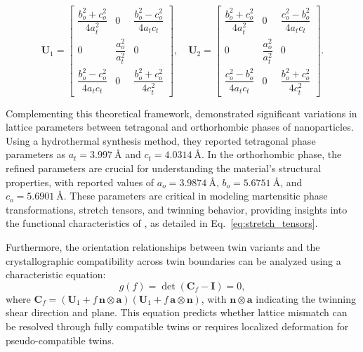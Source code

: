 \documentclass[a4paper,fleqn]{cas-sc}
\begin{document}
\begin{equation}
\mathbf{U}_1 = 
\begin{bmatrix}
\dfrac{b_o^2 + c_o^2}{4 a_t^2} & 0 & \dfrac{b_o^2 - c_o^2}{4 a_t c_t} \\
0 & \dfrac{a_o^2}{a_t^2} & 0 \\
\dfrac{b_o^2 - c_o^2}{4 a_t c_t} & 0 & \dfrac{b_o^2 + c_o^2}{4 c_t^2}
\end{bmatrix},
\quad
\mathbf{U}_2 = 
\begin{bmatrix}
\dfrac{b_o^2 + c_o^2}{4 a_t^2} & 0 & \dfrac{c_o^2 - b_o^2}{4 a_t c_t} \\
0 & \dfrac{a_o^2}{a_t^2} & 0 \\
\dfrac{c_o^2 - b_o^2}{4 a_t c_t} & 0 & \dfrac{b_o^2 + c_o^2}{4 c_t^2}
\end{bmatrix}.
\label{eq:stretch_tensors}
\end{equation}
\par Complementing this theoretical framework, \cite{zhu2024twinning} demonstrated significant variations in lattice parameters between tetragonal and orthorhombic phases of  nanoparticles. Using a hydrothermal synthesis method, they reported tetragonal phase parameters as \(a_t = \SI{3.997}{\angstrom}\) and \(c_t = \SI{4.0314}{\angstrom}\). In the orthorhombic phase, the refined parameters are crucial for understanding the material's structural properties, with reported values of \(a_o = \SI{3.9874}{\angstrom}\), \(b_o = \SI{5.6751}{\angstrom}\), and \(c_o = \SI{5.6901}{\angstrom}\). These parameters are critical in modeling martensitic phase transformations, stretch tensors, and twinning behavior, providing insights into the functional characteristics of , as detailed in Eq.~\ref{eq:stretch_tensors}.

\par Furthermore, the orientation relationships between twin variants and the crystallographic compatibility across twin boundaries can be analyzed using a characteristic equation:
\begin{equation}
g(f) = \det(\mathbf{C}_f - \mathbf{I}) = 0,
\label{eq:characteristic_eq}
\end{equation}
where \(\mathbf{C}_f = (\mathbf{U}_1 + f \, \mathbf{n} \otimes \mathbf{a})(\mathbf{U}_1 + f \, \mathbf{a} \otimes \mathbf{n})\), with \(\mathbf{n} \otimes \mathbf{a}\) indicating the twinning shear direction and plane. This equation predicts whether lattice mismatch can be resolved through fully compatible twins or requires localized deformation for pseudo-compatible twins.
\end{document}
